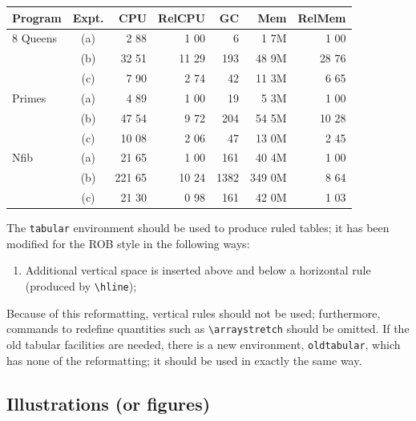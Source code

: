 \documentclass[DTMColor]{ROB-New}
\begin{document}
\begin{table}[h!]
 {\begin{fntable}\centering
    \begin{tabular}{@{\extracolsep{\fill}}lcrrrrr}
    \hline
     Program& Expt.&CPU&RelCPU&GC& Mem&RelMem\\
    \hline
    8 Queens& (a)&   2 88&  1 00&    6&   1 7M&  1 00\\
    &         (b)&  32 51& 11 29&  193&  48 9M& 28 76\\
    &         (c)&   7 90&  2 74&   42&  11 3M&  6 65\\
    Primes&   (a)&   4 89&  1 00&   19&   5 3M&  1 00\\
    &         (b)&  47 54&  9 72&  204&  54 5M& 10 28\\
    &         (c)&  10 08&  2 06&   47&  13 0M&  2 45\\
    Nfib&     (a)&  21 65&  1 00&  161&  40 4M&  1 00\\
    &         (b)& 221 65& 10 24& 1382& 349 0M&  8 64\\
    &         (c)&  21 30&  0 98&  161&  42 0M&  1 03\\
    \hline
    \end{tabular}
  \end{fntable}}
\end{table}

The \verb"tabular" environment should be used to produce ruled tables;
it has been modified for the ROB style in the following ways:
\begin{enumerate}
  \item Additional vertical space is inserted above and below a horizontal rule
        (produced by \verb"\hline");
\end{enumerate}
Because of this reformatting, vertical rules should not be used;
furthermore, commands to
redefine quantities such as \verb"\arraystretch" should be omitted. If
the old tabular facilities are needed, there is a new environment,
\verb"oldtabular", which has none of the reformatting; it should be used
in exactly the same way.

\subsection{Illustrations (or figures)}
\end{document}
